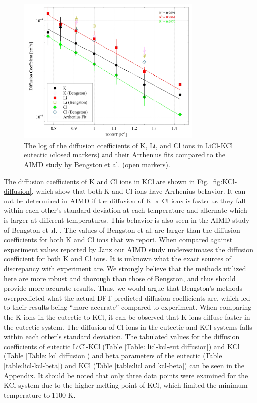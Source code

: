 \documentclass[review]{elsarticle}
\providecommand{\DIFaddtex}[1]{{\protect\color{blue} \sf #1}} %
\providecommand{\DIFaddbegin}{} %
\providecommand{\DIFaddend}{} %
\providecommand{\DIFadd}[1]{\texorpdfstring{\DIFaddtex{#1}}{#1}} %
\newcommand{\DIFaddincludegraphics}[2][]{{\color{blue}\fbox{\DIFOincludegraphics[#1]{#2}}}} %
\DeclareRobustCommand{\DIFaddbegin}{\DIFOaddbegin \let\includegraphics\DIFaddincludegraphics} %
\DeclareRobustCommand{\DIFaddend}{\DIFOaddend \let\includegraphics\DIFOincludegraphics} %
\begin{document}
\begin{figure}[h!]
 \centering
 \includegraphics[width=0.8\textwidth]{diff_eutectic_licl_kcl.jpg} 
 \caption{The log of the diffusion coefficients of K, Li, and Cl ions in LiCl-KCl eutectic (closed markers) and their Arrhenius fits compared to the AIMD study by Bengston et al. \cite{Bengston2014} (open markers).}
 \label{fig:LiCl-KCl-diffusion}
\end{figure} 

The diffusion coefficients of K and Cl ions in KCl are shown in Fig. \ref{fig:KCl-diffusion}, which show that both K and Cl ions have Arrhenius behavior. It can not be determined in AIMD if the diffusion of K or Cl ions is faster as they fall within each other's standard deviation at each temperature and alternate which is larger at different temperatures. This behavior is also seen in the AIMD study of Bengston et al. \cite{Bengston2014}. The values of Bengston et al. are larger than the diffusion coefficients for both K and Cl ions that we report. When compared against experiment values reported by Janz \cite{janz_Diffusion} our AIMD study underestimates the diffusion coefficient for both K and Cl ions. \DIFaddbegin \DIFadd{It is unknown what the exact sources of discrepancy with experiment are. We strongly believe that the methods utilized here are more robust and thorough than those of Bengston, and thus should provide more accurate results. Thus, we would argue that Bengston’s methods overpredicted what the actual DFT-predicted diffusion coefficients are, which led to their results being “more accurate” compared to experiment. }\DIFaddend When comparing the K ions in the eutectic to KCl, it can be observed that K ions diffuse faster in the eutectic system. The diffusion of Cl ions in the eutectic and KCl systems falls within each other's standard deviation. The tabulated values for the diffusion coefficients of eutectic LiCl-KCl (Table \ref{Table: licl-kcl-eut diffusion}) and KCl (Table \ref{Table: kcl diffusion}) and beta parameters of the eutectic (Table \ref{table:licl-kcl-beta}) and KCl (Table \ref{table:licl and kcl-beta}) can be seen in the Appendix. It should be noted that only three data points were examined for the KCl system due to the higher melting point of KCl, which limited the minimum temperature to 1100 K. 
\end{document}
